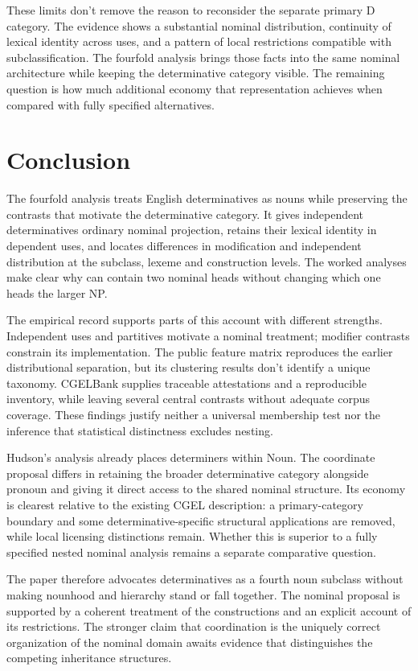\documentclass[12pt]{article}
\begin{document}
These limits don't remove the reason to reconsider the separate primary D category. The evidence shows a substantial nominal distribution, continuity of lexical identity across uses, and a pattern of local restrictions compatible with subclassification. The fourfold analysis brings those facts into the same nominal architecture while keeping the determinative category visible. The remaining question is how much additional economy that representation achieves when compared with fully specified alternatives.

\section{Conclusion}\label{sec:conclusion}

The fourfold analysis treats English determinatives as nouns while preserving the contrasts that motivate the determinative category. It gives independent determinatives ordinary nominal projection, retains their lexical identity in dependent uses, and locates differences in modification and independent distribution at the subclass, lexeme and construction levels. The worked analyses make clear why  can contain two nominal heads without changing which one heads the larger NP.

The empirical record supports parts of this account with different strengths. Independent uses and partitives motivate a nominal treatment; modifier contrasts constrain its implementation. The public feature matrix reproduces the earlier distributional separation, but its clustering results don't identify a unique taxonomy. CGELBank supplies traceable attestations and a reproducible inventory, while leaving several central contrasts without adequate corpus coverage. These findings justify neither a universal membership test nor the inference that statistical distinctness excludes nesting.

Hudson's analysis already places determiners within Noun. The coordinate proposal differs in retaining the broader determinative category alongside pronoun and giving it direct access to the shared nominal structure. Its economy is clearest relative to the existing CGEL description: a primary-category boundary and some determinative-specific structural applications are removed, while local licensing distinctions remain. Whether this is superior to a fully specified nested nominal analysis remains a separate comparative question.

The paper therefore advocates determinatives as a fourth noun subclass without making nounhood and hierarchy stand or fall together. The nominal proposal is supported by a coherent treatment of the constructions and an explicit account of its restrictions. The stronger claim that coordination is the uniquely correct organization of the nominal domain awaits evidence that distinguishes the competing inheritance structures.
\end{document}
